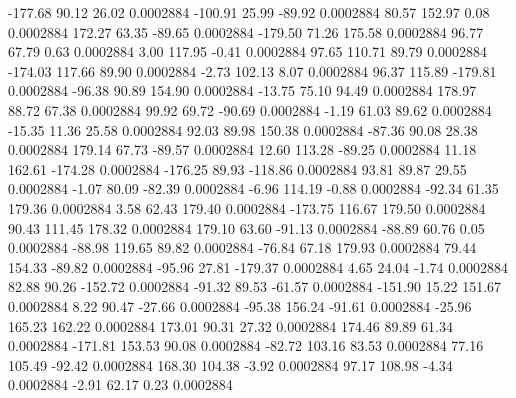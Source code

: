      -177.68       90.12       26.02     0.0002884
     -100.91       25.99      -89.92     0.0002884
       80.57      152.97        0.08     0.0002884
      172.27       63.35      -89.65     0.0002884
     -179.50       71.26      175.58     0.0002884
       96.77       67.79        0.63     0.0002884
        3.00      117.95       -0.41     0.0002884
       97.65      110.71       89.79     0.0002884
     -174.03      117.66       89.90     0.0002884
       -2.73      102.13        8.07     0.0002884
       96.37      115.89     -179.81     0.0002884
      -96.38       90.89      154.90     0.0002884
      -13.75       75.10       94.49     0.0002884
      178.97       88.72       67.38     0.0002884
       99.92       69.72      -90.69     0.0002884
       -1.19       61.03       89.62     0.0002884
      -15.35       11.36       25.58     0.0002884
       92.03       89.98      150.38     0.0002884
      -87.36       90.08       28.38     0.0002884
      179.14       67.73      -89.57     0.0002884
       12.60      113.28      -89.25     0.0002884
       11.18      162.61     -174.28     0.0002884
     -176.25       89.93     -118.86     0.0002884
       93.81       89.87       29.55     0.0002884
       -1.07       80.09      -82.39     0.0002884
       -6.96      114.19       -0.88     0.0002884
      -92.34       61.35      179.36     0.0002884
        3.58       62.43      179.40     0.0002884
     -173.75      116.67      179.50     0.0002884
       90.43      111.45      178.32     0.0002884
      179.10       63.60      -91.13     0.0002884
      -88.89       60.76        0.05     0.0002884
      -88.98      119.65       89.82     0.0002884
      -76.84       67.18      179.93     0.0002884
       79.44      154.33      -89.82     0.0002884
      -95.96       27.81     -179.37     0.0002884
        4.65       24.04       -1.74     0.0002884
       82.88       90.26     -152.72     0.0002884
      -91.32       89.53      -61.57     0.0002884
     -151.90       15.22      151.67     0.0002884
        8.22       90.47      -27.66     0.0002884
      -95.38      156.24      -91.61     0.0002884
      -25.96      165.23      162.22     0.0002884
      173.01       90.31       27.32     0.0002884
      174.46       89.89       61.34     0.0002884
     -171.81      153.53       90.08     0.0002884
      -82.72      103.16       83.53     0.0002884
       77.16      105.49      -92.42     0.0002884
      168.30      104.38       -3.92     0.0002884
       97.17      108.98       -4.34     0.0002884
       -2.91       62.17        0.23     0.0002884
